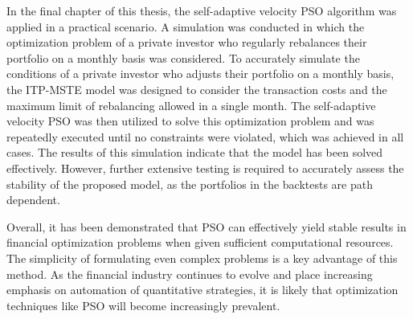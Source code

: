 \documentclass[
  oneside, a4paper, 12pt, openany]{book}
\theoremstyle{definition}
\theoremstyle{definition}
\theoremstyle{definition}
\theoremstyle{definition}
\theoremstyle{remark}
\begin{document}
In the final chapter of this thesis, the self-adaptive velocity PSO algorithm was applied in a practical scenario. A simulation was conducted in which the optimization problem of a private investor who regularly rebalances their portfolio on a monthly basis was considered. To accurately simulate the conditions of a private investor who adjusts their portfolio on a monthly basis, the ITP-MSTE model was designed to consider the transaction costs and the maximum limit of rebalancing allowed in a single month. The self-adaptive velocity PSO was then utilized to solve this optimization problem and was repeatedly executed until no constraints were violated, which was achieved in all cases. The results of this simulation indicate that the model has been solved effectively. However, further extensive testing is required to accurately assess the stability of the proposed model, as the portfolios in the backtests are path dependent.

Overall, it has been demonstrated that PSO can effectively yield stable results in financial optimization problems when given sufficient computational resources. The simplicity of formulating even complex problems is a key advantage of this method. As the financial industry continues to evolve and place increasing emphasis on automation of quantitative strategies, it is likely that optimization techniques like PSO will become increasingly prevalent.

  


\end{document}
